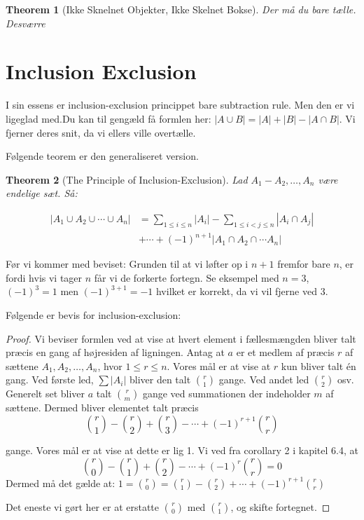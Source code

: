 \documentclass[11pt]{article}
\newtheorem{theorem}{Theorem}
\theoremstyle{definition}
\theoremstyle{remark}
\begin{document}
\begin{theorem}[Ikke Sknelnet Objekter, Ikke Skelnet Bokse]
Der må du bare tælle. Desværre
\end{theorem}

  \newpage

\section{Inclusion Exclusion}
\label{sec:inclexcl}

I sin essens er inclusion-exclusion princippet bare subtraction rule. Men den er vi ligeglad med.Du kan til gengæld få formlen her:
$|A \cup B| = |A| + |B| - |A \cap B|$. Vi fjerner deres snit, da vi ellers ville overtælle.


Følgende teorem er den generaliseret version.
\begin{theorem}[The Principle of Inclusion-Exclusion]
  Lad $A_{1}- A_{2}, \ldots, A_{n}$ være endelige sæt. Så:

  \begin{equation}
    \begin{split}
      |A_{1} \cup A_{2} \cup \cdots \cup A_{n}| &= \sum_{1 \leq i \leq n}|A_{i}| - \sum_{1 \leq i < j \leq n}|A_{i}\cap A_{j}|\\
      &+ \cdots + (-1)^{n+1} |A_{1} \cap A_{2} \cap \cdots A_{n}|
    \end{split}
  \end{equation}
  \end{theorem}

  Før vi kommer med beviset: Grunden til at vi løfter op i $n+1$ fremfor bare $n$, er fordi hvis vi tager $n$ får vi de forkerte fortegn. Se eksempel med $n = 3$, $(-1)^{3} = 1$ men $(-1)^{3+1}=-1$ hvilket er korrekt, da vi vil fjerne ved 3. 

  Følgende er bevis for inclusion-exclusion:

\begin{proof}
  Vi beviser formlen ved at vise at hvert element i fællesmængden bliver talt præcis en gang af højresiden af ligningen.
  Antag at $a$ er et medlem af præcis $r$ af sættene $A_{1}, A_{2}, \ldots, A_{n}$, hvor $1 \leq r \leq n$. Vores mål er at vise at $r$ kun bliver talt én gang. Ved første led, $\sum |A_{i}|$ bliver den talt $\binom{r}{1}$ gange. Ved andet led $\binom{r}{2}$ osv. Generelt set bliver $a$ talt $\binom{r}{m}$ gange ved summationen der indeholder $m$ af sættene. Dermed bliver elementet talt præcis
  \[
\binom{r}{1} - \binom{r}{2} + \binom{r}{3} - \cdots + (-1)^{r+1} \binom{r}{r}
  \]

  gange. Vores mål er at vise at dette er lig 1. Vi ved fra corollary 2 i kapitel 6.4, at
  \[
\binom{r}{0} - \binom{r}{1} + \binom{r}{2} - \cdots + (-1)^{r}\binom{r}{r} = 0
  \]
  Dermed må det gælde at:
  $1 = \binom{r}{0} = \binom{r}{1} - \binom{r}{2} + \cdots + (-1)^{r+1} \binom{r}{r}$

  Det eneste vi gørt her er at erstatte $\binom{r}{0}$ med $\binom{r}{1}$, og skifte fortegnet. 
\end{proof}
\end{document}
